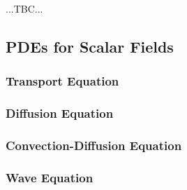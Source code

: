 

...TBC...


\subsection{PDEs for Scalar Fields}

\subsubsection{Transport Equation}


\subsubsection{Diffusion Equation}


\subsubsection{Convection-Diffusion Equation}


\subsubsection{Wave Equation}


